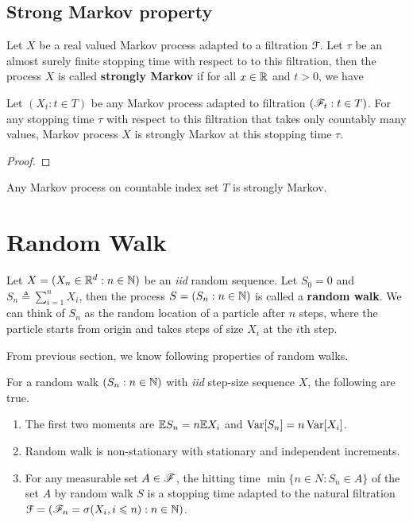 \documentclass[a4paper,10pt,english]{article}
\begin{document}
\subsection{Strong Markov property}
Let $X$ be a real valued Markov process adapted to a filtration $\mathcal{F}$. 
Let $\tau$ be an almost surely finite stopping time with respect to to this filtration, 
then the process $X$ is called \textbf{strongly Markov} if for all $x \in \mathbb{R}$ and $t > 0$, we have 

\begin{lem} 
Let $(X_t: t \in T)$ be any Markov process adapted to filtration $(\mathscr{F}_t: t \in T)$. 
For any stopping time $\tau$ with respect to this filtration that takes only countably many values, 
Markov process $X$ is strongly Markov at this stopping time $\tau$. 
\end{lem}
\begin{proof}
\end{proof}

\begin{cor}
Any Markov process on countable index set $T$ is strongly Markov. 
\end{cor}


\section{Random Walk}
Let $X = (X_n \in \mathbb{R}^d: n \in \mathbb{N})$ be an \emph{iid} random sequence. 
Let $S_0 = 0$ and $S_n \triangleq \sum_{i=1}^nX_i$, then the process $S = (S_n: n \in \mathbb{N})$ is called a \textbf{random walk}. 
We can think of $S_n$ as the random location of a particle after $n$ steps, 
where the particle starts from origin and takes steps of size $X_i$ at the $i$th step. 

From previous section, we know following properties of random walks. 
\begin{thm} 
For a random walk $(S_n: n \in \mathbb{N})$ with \emph{iid} step-size sequence $X$, the following are true. 
\begin{enumerate}[i\_]
\item The first two moments are $\mathbb{E} S_n = n\mathbb{E} X_i$ and $\operatorname{Var}[S_n] = n\operatorname{Var}[X_i]$. 
\item Random walk is non-stationary with stationary and independent increments. 
\item For any measurable set $A \in \mathscr{F}$, the hitting time  $\min\{n \in N: S_n \in A\}$ of the set $A$ by random walk $S$ is a stopping time adapted to the natural filtration $\mathcal{F} = (\mathscr{F}_n = \sigma(X_i, i \leqslant n): n \in \mathbb{N})$.
\end{enumerate}
\end{thm}
\end{document}
